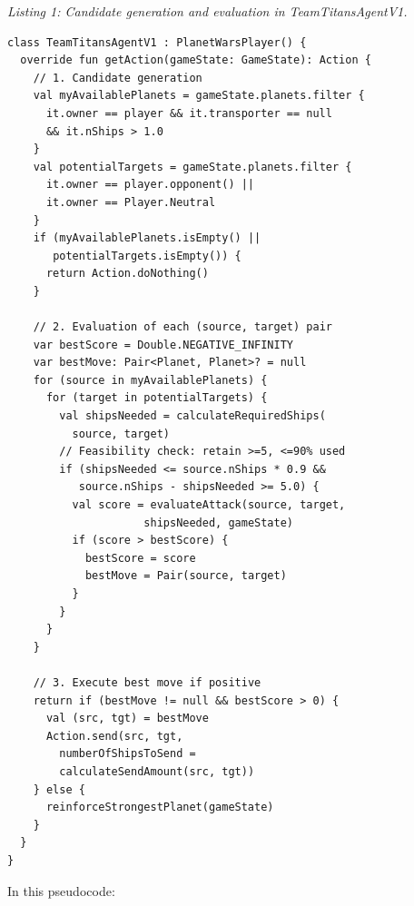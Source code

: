 \documentclass[conference]{IEEEtran}
\begin{document}
\textit{Listing 1: Candidate generation and evaluation in TeamTitansAgentV1.}

\begin{scriptsize}
\raggedright
\begin{verbatim}
class TeamTitansAgentV1 : PlanetWarsPlayer() {
  override fun getAction(gameState: GameState): Action {
    // 1. Candidate generation
    val myAvailablePlanets = gameState.planets.filter {
      it.owner == player && it.transporter == null 
      && it.nShips > 1.0
    }
    val potentialTargets = gameState.planets.filter {
      it.owner == player.opponent() || 
      it.owner == Player.Neutral
    }
    if (myAvailablePlanets.isEmpty() || 
       potentialTargets.isEmpty()) {
      return Action.doNothing()
    }

    // 2. Evaluation of each (source, target) pair
    var bestScore = Double.NEGATIVE_INFINITY
    var bestMove: Pair<Planet, Planet>? = null
    for (source in myAvailablePlanets) {
      for (target in potentialTargets) {
        val shipsNeeded = calculateRequiredShips(
          source, target)
        // Feasibility check: retain >=5, <=90% used
        if (shipsNeeded <= source.nShips * 0.9 && 
           source.nShips - shipsNeeded >= 5.0) {
          val score = evaluateAttack(source, target, 
                     shipsNeeded, gameState)
          if (score > bestScore) {
            bestScore = score
            bestMove = Pair(source, target)
          }
        }
      }
    }

    // 3. Execute best move if positive
    return if (bestMove != null && bestScore > 0) {
      val (src, tgt) = bestMove
      Action.send(src, tgt, 
        numberOfShipsToSend = 
        calculateSendAmount(src, tgt))
    } else {
      reinforceStrongestPlanet(gameState)
    }
  }
}
\end{verbatim}
\end{scriptsize}

In this pseudocode:
\end{document}
